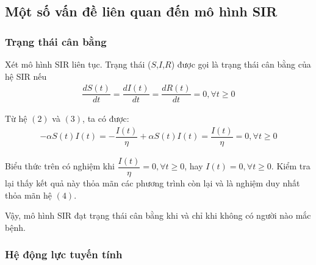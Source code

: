 \documentclass[a4paper]{article}
\begin{document}
\subsection{Một số vấn đề liên quan đến mô hình SIR}

\subsubsection{Trạng thái cân bằng}

Xét mô hình SIR liên tục. Trạng thái ($S$,$I$,$R$) được gọi là trạng thái cân bằng của hệ SIR nếu
\begin{align}
    \dfrac{dS(t)}{dt} = \dfrac{dI(t)}{dt} = \dfrac{dR(t)}{dt} = 0,\forall t \geq 0
\end{align}

Từ hệ $(2)$ và $(3)$, ta có được:
\begin{align}
    -\alpha S(t)I(t) = - \dfrac{I(t)}{\eta} +  \alpha S(t)I(t) = \dfrac{I(t)}{\eta}  = 0,\forall t \geq 0
\end{align}

Biểu thức trên có nghiệm khi $\dfrac{I(t)}{\eta} = 0,\forall t \geq 0$, hay $I(t) = 0,\forall t \geq 0$. Kiểm tra lại thấy kết quả này thỏa mãn các phương trình còn lại và là nghiệm duy nhất thỏa mãn hệ $(4)$.

Vậy, mô hình SIR đạt trạng thái cân bằng khi và chỉ khi không có người nào mắc bệnh.

\subsubsection{Hệ động lực tuyến tính}
\end{document}

